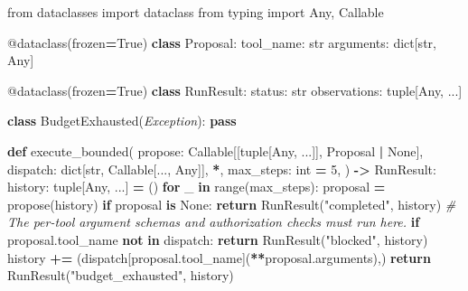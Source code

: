 \documentclass[
  10pt,
]{article}
\newenvironment{Shaded}{\begin{snugshade}}{\end{snugshade}}
\newcommand{\AttributeTok}[1]{\textcolor[rgb]{0.13,0.29,0.53}{#1}}
\newcommand{\BuiltInTok}[1]{#1}
\newcommand{\CommentTok}[1]{\textcolor[rgb]{0.56,0.35,0.01}{\textit{#1}}}
\newcommand{\ControlFlowTok}[1]{\textcolor[rgb]{0.13,0.29,0.53}{\textbf{#1}}}
\newcommand{\DecValTok}[1]{\textcolor[rgb]{0.00,0.00,0.81}{#1}}
\newcommand{\ImportTok}[1]{#1}
\newcommand{\KeywordTok}[1]{\textcolor[rgb]{0.13,0.29,0.53}{\textbf{#1}}}
\newcommand{\NormalTok}[1]{#1}
\newcommand{\OperatorTok}[1]{\textcolor[rgb]{0.81,0.36,0.00}{\textbf{#1}}}
\newcommand{\PreprocessorTok}[1]{\textcolor[rgb]{0.56,0.35,0.01}{\textit{#1}}}
\newcommand{\StringTok}[1]{\textcolor[rgb]{0.31,0.60,0.02}{#1}}
\newcommand{\VariableTok}[1]{\textcolor[rgb]{0.00,0.00,0.00}{#1}}
\begin{document}
\begin{Shaded}
\begin{Highlighting}[]
\ImportTok{from}\NormalTok{ dataclasses }\ImportTok{import}\NormalTok{ dataclass}
\ImportTok{from}\NormalTok{ typing }\ImportTok{import}\NormalTok{ Any, Callable}

\AttributeTok{@dataclass}\NormalTok{(frozen}\OperatorTok{=}\VariableTok{True}\NormalTok{)}
\KeywordTok{class}\NormalTok{ Proposal:}
\NormalTok{    tool\_name: }\BuiltInTok{str}
\NormalTok{    arguments: }\BuiltInTok{dict}\NormalTok{[}\BuiltInTok{str}\NormalTok{, Any]}

\AttributeTok{@dataclass}\NormalTok{(frozen}\OperatorTok{=}\VariableTok{True}\NormalTok{)}
\KeywordTok{class}\NormalTok{ RunResult:}
\NormalTok{    status: }\BuiltInTok{str}
\NormalTok{    observations: }\BuiltInTok{tuple}\NormalTok{[Any, ...]}

\KeywordTok{class}\NormalTok{ BudgetExhausted(}\PreprocessorTok{Exception}\NormalTok{):}
    \ControlFlowTok{pass}

\KeywordTok{def}\NormalTok{ execute\_bounded(}
\NormalTok{    propose: Callable[[}\BuiltInTok{tuple}\NormalTok{[Any, ...]], Proposal }\OperatorTok{|} \VariableTok{None}\NormalTok{],}
\NormalTok{    dispatch: }\BuiltInTok{dict}\NormalTok{[}\BuiltInTok{str}\NormalTok{, Callable[..., Any]],}
    \OperatorTok{*}\NormalTok{, max\_steps: }\BuiltInTok{int} \OperatorTok{=} \DecValTok{5}\NormalTok{,}
\NormalTok{) }\OperatorTok{{-}\textgreater{}}\NormalTok{ RunResult:}
\NormalTok{    history: }\BuiltInTok{tuple}\NormalTok{[Any, ...] }\OperatorTok{=}\NormalTok{ ()}
    \ControlFlowTok{for}\NormalTok{ \_ }\KeywordTok{in} \BuiltInTok{range}\NormalTok{(max\_steps):}
\NormalTok{        proposal }\OperatorTok{=}\NormalTok{ propose(history)}
        \ControlFlowTok{if}\NormalTok{ proposal }\KeywordTok{is} \VariableTok{None}\NormalTok{:}
            \ControlFlowTok{return}\NormalTok{ RunResult(}\StringTok{"completed"}\NormalTok{, history)}
        \CommentTok{\# The per{-}tool argument schemas and authorization checks must run here.}
        \ControlFlowTok{if}\NormalTok{ proposal.tool\_name }\KeywordTok{not} \KeywordTok{in}\NormalTok{ dispatch:}
            \ControlFlowTok{return}\NormalTok{ RunResult(}\StringTok{"blocked"}\NormalTok{, history)}
\NormalTok{        history }\OperatorTok{+=}\NormalTok{ (dispatch[proposal.tool\_name](}\OperatorTok{**}\NormalTok{proposal.arguments),)}
    \ControlFlowTok{return}\NormalTok{ RunResult(}\StringTok{"budget\_exhausted"}\NormalTok{, history)}
\end{Highlighting}
\end{Shaded}
\end{document}
